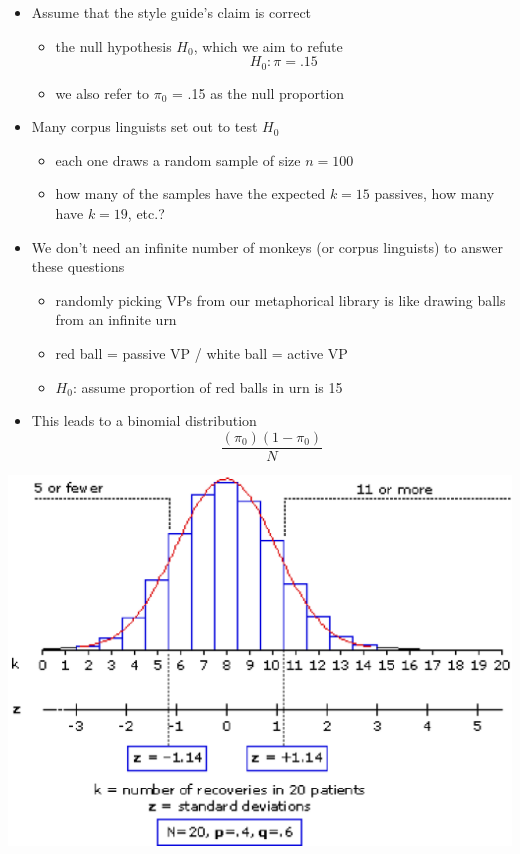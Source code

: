 \documentclass[a4paper,landscape,headrule,footrule,dvips]{foils}
\begin{document}
\begin{CJK}{UTF8}{min}
\begin{itemize}
\item Assume that the style guide's claim is correct
\begin{itemize}
\item the null hypothesis $H_0$, which we aim to refute
\\ \[H_0:\pi = .15 \]
\item we also refer to $\pi_0$ = .15 as the null proportion
\end{itemize}
\item Many corpus linguists set out to test $H_0$
\begin{itemize}
\item each one draws a random sample of size $n = 100$
\item how many of the samples have the expected $k = 15$
passives, how many have $k = 19$, etc.?
\end{itemize}
\end{itemize}

\begin{itemize}
\item We don't need an infinite number of monkeys
(or corpus linguists) to answer these questions
\begin{itemize}
\item randomly picking VPs from our metaphorical library
is like drawing balls from an infinite urn
\item red ball = passive VP / white ball = active VP
\item $H_0$: assume proportion of red balls in urn is 15%
\end{itemize}
\item This leads to a binomial distribution
\[ \frac{(\pi_0)(1 - \pi_0)}{N} \]
\end{itemize}




\begin{center}
  \includegraphics[height=0.98\textheight]{include/binom.eps}
\end{center}



\end{CJK}
\end{document}
